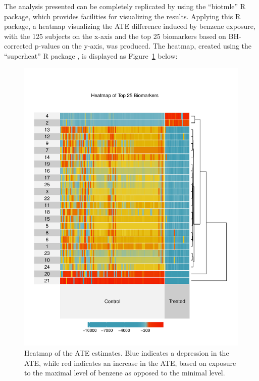 The analysis presented can be completely replicated by using the ``biotmle'' R
package, which provides facilities for visualizing the results. Applying this
R package, a heatmap visualizing the ATE difference induced by benzene exposure,
with the 125 subjects on the x-axis and the top 25 biomarkers based on
BH-corrected p-values on the y-axis, was produced. The heatmap, created using
the ``superheat'' R package \cite{barter2017superheat}, is displayed as
Figure~\ref{fig:heatmap} below:

\begin{figure}[H]
  \vspace{-6em}
  \label{fig:heatmap}
  \centering
  \includegraphics[scale=0.75]{figs/superheatmap.pdf}
  \caption{Heatmap of the ATE estimates. Blue indicates a depression in the
    ATE, while red indicates an increase in the ATE, based on exposure to the
    maximal level of benzene as opposed to the minimal level.}
\end{figure}

